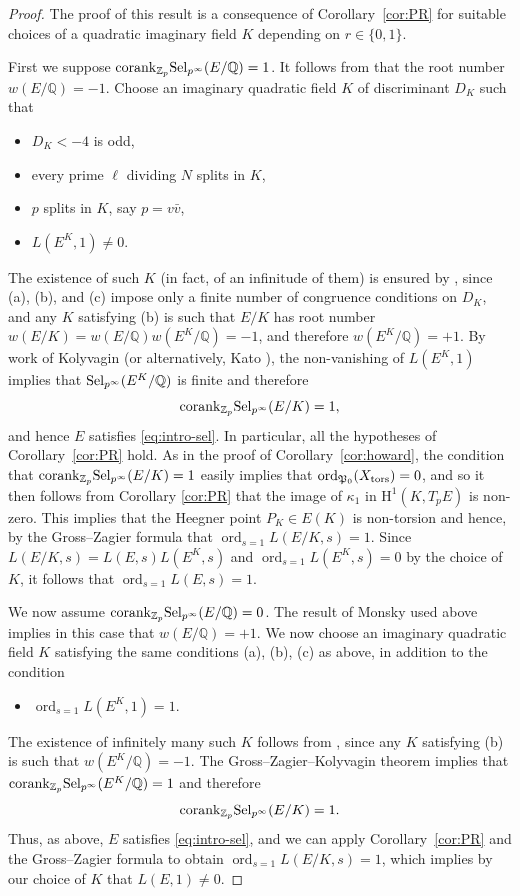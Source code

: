 \documentclass[10pt]{amsart}
\numberwithin{equation}{section}
\theoremstyle{definition}
\theoremstyle{remark}
\newcommand{\Z}{\mathbb{Z}}
\newcommand{\bQ}{\mathbb{Q}}
\newcommand{\Q}{\mathbb{Q}}
\newcommand{\rH}{\mathrm{H}}
\DeclareMathOperator{\ord}{ord}
\begin{document}
\begin{proof}
The proof of this result is a consequence of Corollary~\ref{cor:PR} for suitable choices of a quadratic imaginary field $K$ depending on $r\in\{0,1\}$.

First we suppose ${\rm corank}_{\Z_p}{\rm Sel}_{p^\infty}(E/\Q) = 1$. It follows from \cite[Theorem 1.5]{monsky} that the root number $w(E/\Q)=-1$.  Choose an imaginary quadratic field $K$ of discriminant $D_K$ such that
\begin{itemize}
\item[(a)] $D_K<-4$ is odd,
\item[(b)] every prime $\ell$ dividing $N$ splits in $K$,
\item[(c)] $p$ splits in $K$, say $p=v\bar{v}$,
\item[(d)] $L(E^K,1)\neq 0$.
\end{itemize}
The existence of such $K$ (in fact, of an infinitude of them) is ensured by \cite[Thm.~B.1]{twist}, since (a), (b), and (c) impose only a finite number of congruence conditions on $D_K$, and any $K$ satisfying (b) is such that $E/K$ has root number $w(E/K)=w(E/\Q)w(E^K/\bQ)=-1$, and therefore $w(E^K/\bQ)=+1$. By work of Kolyvagin \cite{kolyvagin-mw-sha} (or alternatively, Kato \cite{kato-euler-systems}), the non-vanishing of $L(E^K,1)$ implies that ${\rm Sel}_{p^\infty}(E^K/\Q)$ is finite and therefore
\[
{\rm corank}_{\Z_p}{\rm Sel}_{p^\infty}(E/K) = 1,
\]
and hence $E$ satisfies \eqref{eq:intro-sel}.  In particular, all the hypotheses of Corollary~\ref{cor:PR} hold. 
As in the proof of Corollary~\ref{cor:howard}, the condition that ${\rm corank}_{\Z_p}{\rm Sel}_{p^\infty}(E/K) = 1$ easily implies that 
$\ord_{\mathfrak{P}_0}(X_{\rm tors}) = 0$, and so it then follows from Corollary \ref{cor:PR} that the image of $\kappa_1$ in 
$\rH^1(K,T_pE)$ is non-zero. This implies that the Heegner point $P_K\in E(K)$ is non-torsion and hence, by the Gross--Zagier formula that $\ord_{s=1}L(E/K,s) = 1$. Since $L(E/K,s)= L(E,s)L(E^K,s)$ and $\ord_{s=1}L(E^K,s) = 0$ by the choice of $K$,
it follows that $\ord_{s=1}L(E,s) = 1$.

We now assume ${\rm corank}_{\Z_p}{\rm Sel}_{p^\infty}(E/\Q) = 0$. The result of Monsky used above implies in this case that $w(E/\Q)=+1$. We now choose an imaginary quadratic field $K$ satisfying the same conditions (a), (b), (c) as above, in addition to the condition
\begin{itemize}
\item[(d')] $\ord_{s=1}L(E^K,1)=1$.
\end{itemize} 
The existence of infinitely many such $K$ follows from \cite[Thm.~B.2]{twist}, since any $K$ satisfying (b) is such that $w(E^K/\Q)=-1$. The Gross--Zagier--Kolyvagin theorem %
implies that ${\rm corank}_{\Z_p}{\rm Sel}_{p^\infty}(E^K/\Q) = 1$ and therefore 
\[
{\rm corank}_{\Z_p}{\rm Sel}_{p^\infty}(E/K) = 1.
\]
Thus, as above, $E$ satisfies \eqref{eq:intro-sel}, and we can apply Corollary~\ref{cor:PR} and the Gross--Zagier formula to obtain $\ord_{s=1}L(E/K,s) = 1$, which implies by our choice of $K$ that $L(E,1)\neq 0$. 
\end{proof}
\end{document}
